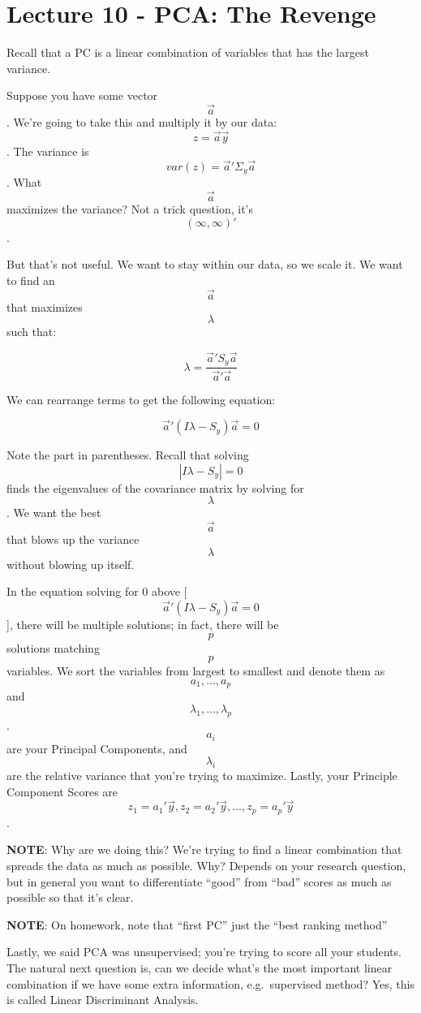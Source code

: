 \hypertarget{lecture-10---pca-the-revenge}{%
\chapter{Lecture 10 - PCA: The
Revenge}\label{lecture-10---pca-the-revenge}}

Recall that a PC is a linear combination of variables that has the
largest variance.

Suppose you have some vector \[\vec{a}\]. We're going to take this and
multiply it by our data: \[z = \vec{a}\vec{y}\]. The variance is
\[var(z) = \vec{a}'\Sigma_y\vec{a}\]. What \[\vec{a}\] maximizes the
variance? Not a trick question, it's \[(\infty, \infty)'\].

But that's not useful. We want to stay within our data, so we scale it.
We want to find an \[\vec{a}\] that maximizes \[\lambda\] such that:

\[ \lambda = \frac{\vec{a}'S_y\vec{a}}{\vec{a}'\vec{a}} \]

We can rearrange terms to get the following equation:

\[\vec{a}'(I\lambda - S_y)\vec{a} = 0\]

Note the part in parentheses. Recall that solving
\[| I\lambda - S_y | = 0\] finds the eigenvalues of the covariance
matrix by solving for \[\lambda\]. We want the best \[\vec{a}\] that
blows up the variance \[\lambda\] without blowing up itself.

In the equation solving for 0 above
{[}\[\vec{a}'(I\lambda - S_y)\vec{a} = 0\]{]}, there will be multiple
solutions; in fact, there will be \[p\] solutions matching \[p\]
variables. We sort the variables from largest to smallest and denote
them as \[a_1, ..., a_p\] and \[\lambda_1, ..., \lambda_p\]. \[a_i\] are
your Principal Components, and \[\lambda_i\] are the relative variance
that you're trying to maximize. Lastly, your Principle Component Scores
are \[z_1 = a_1'\vec{y}, z_2 = a_2'\vec{y}, ..., z_p = a_p'\vec{y}\].

\textbf{NOTE}: Why are we doing this? We're trying to find a linear
combination that spreads the data as much as possible. Why? Depends on
your research question, but in general you want to differentiate
``good'' from ``bad'' scores as much as possible so that it's clear.

\textbf{NOTE}: On homework, note that ``first PC'' just the ``best
ranking method''

Lastly, we said PCA was unsupervised; you're trying to score all your
students. The natural next question is, can we decide what's the most
important linear combination if we have some extra information,
e.g.~supervised method? Yes, this is called Linear Discriminant
Analysis.

